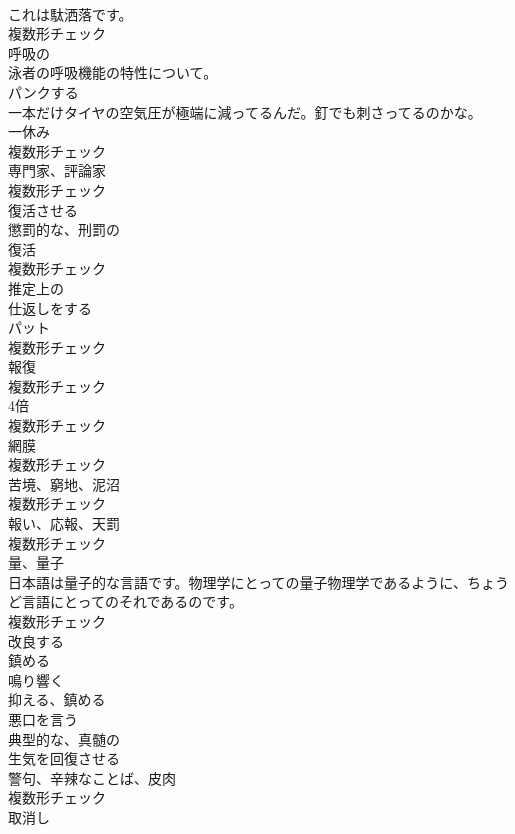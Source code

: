 \documentclass[8pt]{extreport}
\begin{document}
\begin{CJK}{UTF8}{min}
\\	これは駄洒落です。	
\\	複数形チェック
\\	[形容詞]	呼吸の	
\\	泳者の呼吸機能の特性について。	
\\	[動詞]	パンクする	
\\	一本だけタイヤの空気圧が極端に減ってるんだ。釘でも刺さってるのかな。	
\\	[名詞]	一休み	
\\	複数形チェック
\\	[名詞]	専門家、評論家	
\\	複数形チェック
\\	[動詞]	復活させる	
\\	[形容詞]	懲罰的な、刑罰の	
\\	[名詞]	復活	
\\	複数形チェック
\\	[形容詞]	推定上の	
\\	[動詞]	仕返しをする	
\\	[名詞]	パット	
\\	複数形チェック
\\	[名詞]	報復	
\\	複数形チェック
\\	[名詞]	4倍	
\\	複数形チェック
\\	[名詞]	網膜	
\\	複数形チェック
\\	[名詞]	苦境、窮地、泥沼	
\\	複数形チェック
\\	[名詞]	報い、応報、天罰	
\\	複数形チェック
\\	[名詞]	量、量子	
\\	日本語は量子的な言語です。物理学にとっての量子物理学であるように、ちょうど言語にとってのそれであるのです。	
\\	複数形チェック
\\	[動詞]	改良する	
\\	[動詞]	鎮める	
\\	[動詞]	鳴り響く	
\\	[動詞]	抑える、鎮める	
\\	[動詞]	悪口を言う	
\\	[形容詞]	典型的な、真髄の	
\\	[動詞]	生気を回復させる	
\\	[名詞]	警句、辛辣なことば、皮肉	
\\	複数形チェック
\\	[名詞]	取消し	

\end{CJK}
\end{document}
